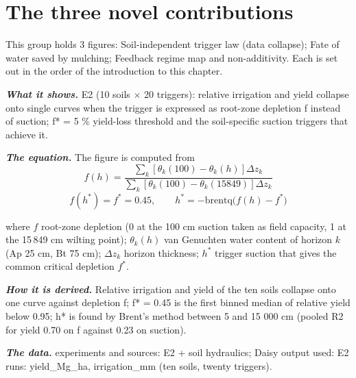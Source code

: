 \section{The three novel contributions}
This group holds 3 figures: Soil-independent trigger law (data collapse); Fate of water saved by mulching; Feedback regime map and non-additivity. Each is set out in the order of the introduction to this chapter.
\par\vspace{6pt}\noindent{}\par\nobreak
{}\label{fig:a20_2}
\par\noindent\textbf{\color{khmag}\emph{What it shows.}} E2 (10 soils $\times$ 20 triggers): relative irrigation and yield collapse onto single curves when the trigger is expressed as root-zone depletion f instead of suction; f* = 5 \% yield-loss threshold and the soil-specific suction triggers that achieve it.
\par\noindent\textbf{\color{khmag}\emph{The equation.}} The figure is computed from
\begin{equation}\boxed{f(h)=\dfrac{\sum_k\left[\theta_k(100)-\theta_k(h)\right]\Delta z_k}{\sum_k\left[\theta_k(100)-\theta_k(15849)\right]\Delta z_k}}\end{equation}
\begin{equation}\boxed{f(h^\ast)=f^\ast=0.45,\qquad h^\ast=-\mathrm{brentq}\bigl(f(h)-f^\ast\bigr)}\end{equation}
\par\noindent where $f$ root-zone depletion (0 at the 100 cm suction taken as field capacity, 1 at the 15\,849 cm wilting point); $\theta_k(h)$ van Genuchten water content of horizon $k$ (Ap 25 cm, Bt 75 cm); $\Delta z_k$ horizon thickness; $h^\ast$ trigger suction that gives the common critical depletion $f^\ast$.
\par\noindent\textbf{\color{khmag}\emph{How it is derived.}} Relative irrigation and yield of the ten soils collapse onto one curve against depletion f; f* = 0.45 is the first binned median of relative yield below 0.95; h* is found by Brent's method between 5 and 15 000 cm (pooled R2 for yield 0.70 on f against 0.23 on suction).
\par\noindent\textbf{\color{khmag}\emph{The data.}} experiments and sources: E2 + soil hydraulics; Daisy output used: E2 runs: yield\_Mg\_ha, irrigation\_mm (ten soils, twenty triggers).
